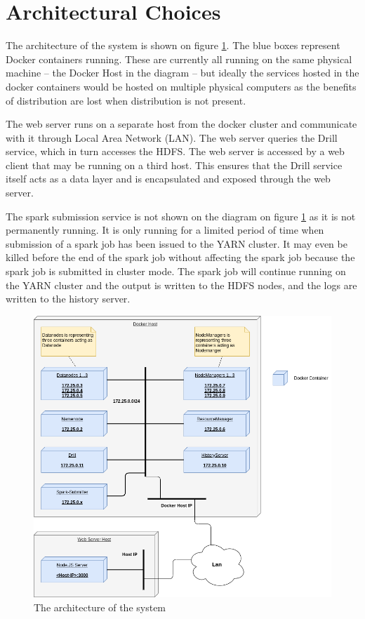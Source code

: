 \documentclass[main.tex]{subfiles}
\begin{document}
\section{Architectural Choices}


The architecture of the system is shown on figure \ref{fig:architecture}. The blue boxes represent Docker containers running. These are currently all running on the same physical machine -- the Docker Host in the diagram -- but ideally the services hosted in the docker containers would be hosted on multiple physical computers as the benefits of distribution are lost when distribution is not present. 

The web server runs on a separate host from the docker cluster and communicate with it through Local Area Network (LAN). The web server queries the Drill service, which in turn accesses the HDFS. The web server is accessed by a web client that may be running on a third host. This ensures that the Drill service itself acts as a data layer and is encapsulated and exposed through the web server.

The spark submission service is not shown on the diagram on figure \ref{fig:architecture} as it is not permanently running. It is only running for a limited period of time when submission of a spark job has been issued to the YARN cluster. It may even be killed before the end of the spark job without affecting the spark job because the spark job is submitted in cluster mode. The spark job will continue running on the YARN cluster and the output is written to the HDFS nodes, and the logs are written to the history server.

\begin{figure}[h]
    \centering
    \includegraphics{Images/Cluster.png}
    \caption{The architecture of the system}
    \label{fig:architecture}
\end{figure}
\end{document}
